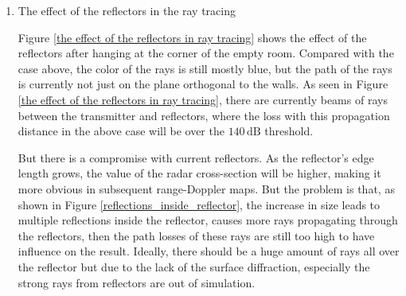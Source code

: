 \documentclass[12pt,DIV14,BCOR12mm,a4paper,footinclude=false,headinclude,parskip=half-,twoside,openright,cleardoublepage=empty,toc=index,bibliography=totoc,listof=totoc]{scrreprt}
\numberwithin{equation}{chapter}
\begin{document}
\begin{enumerate}[label=\textbullet]
    \item The effect of the reflectors in the ray tracing

    Figure \ref{the effect of the reflectors in ray tracing} shows the effect of the reflectors after hanging at the corner of the empty room. Compared with the case above, the color of the rays is still mostly blue, but the path of the rays is currently not just on the plane orthogonal to the walls. As seen in Figure \ref{the effect of the reflectors in ray tracing}, there are currently beams of rays between the transmitter and reflectors, where the loss with this propagation distance in the above case will be over the $140\,\mathrm{dB}$ threshold.

    But there is a compromise with current reflectors. As the reflector's edge length grows, the value of the radar cross-section will be higher, making it more obvious in subsequent range-Doppler maps. But the problem is that, as shown in Figure \ref{reflections_inside_reflector}, the increase in size leads to multiple reflections inside the reflector, causes more rays propagating through the reflectors, then the path losses of these rays are still too high to have influence on the result. Ideally, there should be a huge amount of rays all over the reflector but due to the lack of the surface diffraction, especially the strong rays from reflectors are out of simulation.


\end{enumerate}
\end{document}
